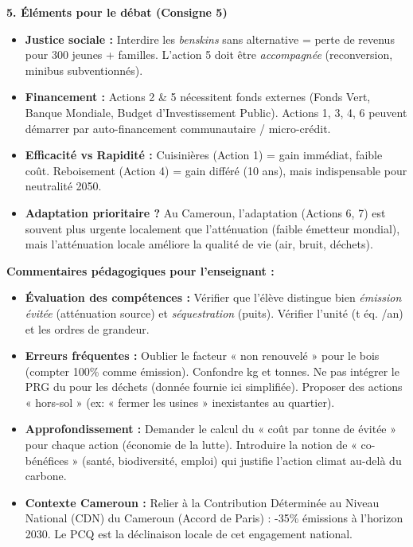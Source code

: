 \documentclass[11pt]{article}
\newcommand{\cle}[1]{{\popxbold\color{popdark}#1}}
\begin{document}
\begin{exoresolu}
\textbf{5. Éléments pour le débat (Consigne 5)}
\begin{itemize}
    \item \textbf{Justice sociale :} Interdire les \emph{benskins} sans alternative = perte de revenus pour 300 jeunes + familles. L'action 5 doit être \emph{accompagnée} (reconversion, minibus subventionnés).
    \item \textbf{Financement :} Actions 2 \& 5 nécessitent fonds externes (Fonds Vert, Banque Mondiale, Budget d'Investissement Public). Actions 1, 3, 4, 6 peuvent démarrer par auto-financement communautaire / micro-crédit.
    \item \textbf{Efficacité vs Rapidité :} Cuisinières (Action 1) = gain immédiat, faible coût. Reboisement (Action 4) = gain différé (10 ans), mais indispensable pour neutralité 2050.
    \item \textbf{Adaptation prioritaire ?} Au Cameroun, l'adaptation (Actions 6, 7) est souvent plus urgente localement que l'atténuation (faible émetteur mondial), mais l'atténuation locale améliore la qualité de vie (air, bruit, déchets).
\end{itemize}
\tcblower
\textbf{Commentaires pédagogiques pour l'enseignant :}
\begin{itemize}
    \item \textbf{Évaluation des compétences :} Vérifier que l'élève distingue bien \emph{émission évitée} (atténuation source) et \emph{séquestration} (puits). Vérifier l'unité (t éq. /an) et les ordres de grandeur.
    \item \textbf{Erreurs fréquentes :} Oublier le facteur « non renouvelé » pour le bois (compter 100\% comme émission). Confondre kg et tonnes. Ne pas intégrer le PRG du  pour les déchets (donnée fournie ici simplifiée). Proposer des actions « hors-sol » (ex: « fermer les usines » inexistantes au quartier).
    \item \textbf{Approfondissement :} Demander le calcul du « coût par tonne de  évitée » pour chaque action (économie de la lutte). Introduire la notion de « \cle{co-bénéfices} » (santé, biodiversité, emploi) qui justifie l'action climat au-delà du carbone.
    \item \textbf{Contexte Cameroun :} Relier à la \cle{Contribution Déterminée au Niveau National (CDN)} du Cameroun (Accord de Paris) : -35\% émissions à l'horizon 2030. Le PCQ est la déclinaison locale de cet engagement national.
\end{itemize}
\end{exoresolu}
\end{document}
